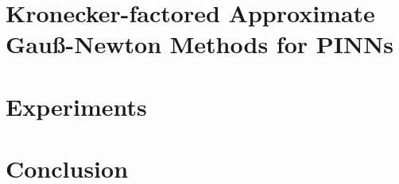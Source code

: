 \documentclass{article}
\begin{document}
\section{Kronecker-factored Approximate Gauß-Newton Methods for PINNs}




\section{Experiments}



\section{Conclusion}







\clearpage
\appendix


\end{document}
